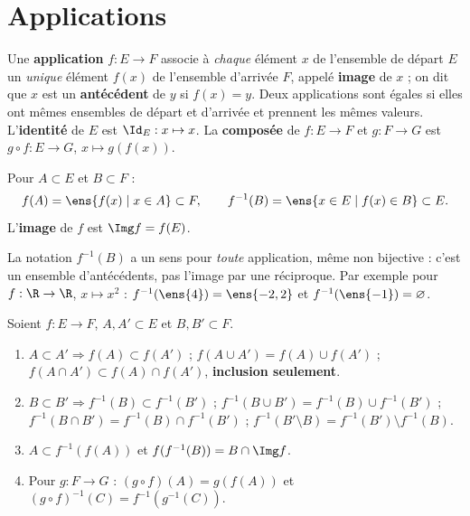 \section{Applications}
\begin{definition}[Application]
Une \textbf{application} $f:E\to F$ associe à \emph{chaque} élément $x$ de l'ensemble de départ $E$ un \emph{unique} élément $f(x)$ de l'ensemble d'arrivée $F$, appelé \textbf{image} de $x$ ; on dit que $x$ est un \textbf{antécédent} de $y$ si $f(x)=y$. Deux applications sont égales si elles ont mêmes ensembles de départ et d'arrivée et prennent les mêmes valeurs. L'\textbf{identité} de $E$ est $\Id_E:x\mapsto x$. La \textbf{composée} de $f:E\to F$ et $g:F\to G$ est $g\circ f:E\to G$, $x\mapsto g(f(x))$.
\end{definition}
\begin{definition}
Pour $A\subset E$ et $B\subset F$ :
\[f(A)=\ens{f(x)\mid x\in A}\subset F,\qquad f^{-1}(B)=\ens{x\in E\mid f(x)\in B}\subset E.\]
L'\textbf{image} de $f$ est $\Img f=f(E)$.
\end{definition}
\begin{attention}
La notation $f^{-1}(B)$ a un sens pour \emph{toute} application, même non bijective : c'est un ensemble d'antécédents, pas l'image par une réciproque. Par exemple pour $f:\R\to\R$, $x\mapsto x^2$ : $f^{-1}(\ens{4})=\ens{-2,2}$ et $f^{-1}(\ens{-1})=\varnothing$.
\end{attention}
\begin{proposition}\label{prop-images}
Soient $f:E\to F$, $A,A'\subset E$ et $B,B'\subset F$.
\begin{enumerate}
\item $A\subset A'\Rightarrow f(A)\subset f(A')$ ; $f(A\cup A')=f(A)\cup f(A')$ ; $f(A\cap A')\subset f(A)\cap f(A')$, \textbf{inclusion seulement}.
\item $B\subset B'\Rightarrow f^{-1}(B)\subset f^{-1}(B')$ ; $f^{-1}(B\cup B')=f^{-1}(B)\cup f^{-1}(B')$ ; $f^{-1}(B\cap B')=f^{-1}(B)\cap f^{-1}(B')$ ; $f^{-1}(B'\setminus B)=f^{-1}(B')\setminus f^{-1}(B)$.
\item $A\subset f^{-1}(f(A))$ et $f(f^{-1}(B))=B\cap\Img f$.
\item Pour $g:F\to G$ : $(g\circ f)(A)=g(f(A))$ et $(g\circ f)^{-1}(C)=f^{-1}(g^{-1}(C))$.
\end{enumerate}
\end{proposition}
